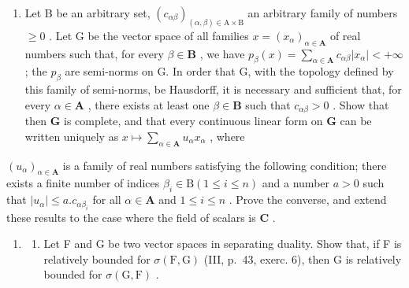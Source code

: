\begin{enumerate}
\def\labelenumi{\alph{enumi})}
\setcounter{enumi}{2}
\tightlist
\item
  Let B be an arbitrary set, \((c_{\alpha \beta})_{(\alpha ,\beta)\in \mathrm{A}\times \mathrm{B}}\) an arbitrary family of numbers \(\geqslant 0\) . Let G be the vector space of all families \(x = (x_{\alpha})_{\alpha \in \mathbf{A}}\) of real numbers such that, for every \(\beta \in \mathbf{B}\) , we have \(p_{\beta}(x) = \sum_{\alpha \in \mathbf{A}}c_{\alpha \beta}|x_{\alpha}| < + \infty\) ; the \(p_{\beta}\) are semi-norms on G. In order that G, with the topology defined by this family of semi-norms, be Hausdorff, it is necessary and sufficient that, for every \(\alpha \in \mathbf{A}\) , there exists at least one \(\beta \in \mathbf{B}\) such that \(c_{\alpha \beta} > 0\) . Show that then \(\mathbf{G}\) is complete, and that every continuous linear form on \(\mathbf{G}\) can be written uniquely as \(x \mapsto \sum_{\alpha \in \mathbf{A}} u_{\alpha} x_{\alpha}\) , where
\end{enumerate}

\((u_{\alpha})_{\alpha \in \mathbf{A}}\) is a family of real numbers satisfying the following condition; there exists a finite number of indices \(\beta_{i}\in \mathrm{B}(1\leqslant i\leqslant n)\) and a number \(a > 0\) such that \(|u_{\alpha}|\leqslant a.c_{\alpha \beta_i}\) for all \(\alpha \in \mathbf{A}\) and \(1\leqslant i\leqslant n\) . Prove the converse, and extend these results to the case where the field of scalars is \(\mathbf{C}\) .

\begin{enumerate}
\def\labelenumi{\arabic{enumi})}
\setcounter{enumi}{1}
\tightlist
\item
  \begin{enumerate}
  \def\labelenumii{\alph{enumii})}
  \tightlist
  \item
    Let F and G be two vector spaces in separating duality. Show that, if F is relatively bounded for \(\sigma(\mathrm{F}, \mathrm{G})\) (III, p.~43, exerc. 6), then G is relatively bounded for \(\sigma(\mathrm{G}, \mathrm{F})\) .
  \end{enumerate}
\end{enumerate}

